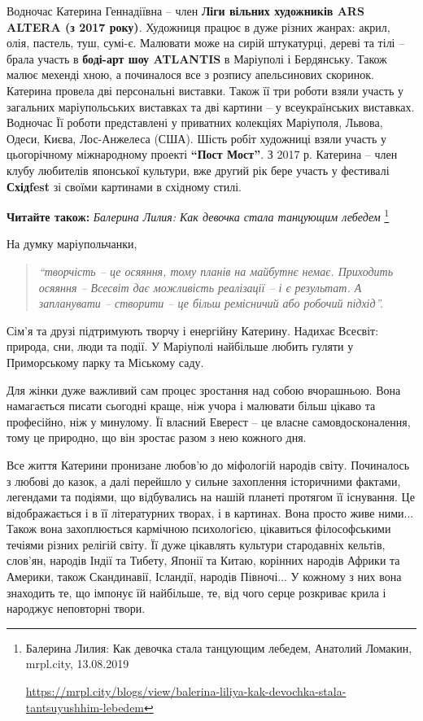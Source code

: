 Водночас Катерина Геннадіївна – член \textbf{Ліги вільних художників ARS ALTERA (з 2017
року)}. Художниця працює в дуже різних жанрах: акрил, олія, пастель, туш,
сумі-є. Малювати може на сирій штукатурці, дереві та тілі – брала участь в
\textbf{боді-арт шоу ATLANTIS} в Маріуполі і Бердянську. Також малює мехенді хною, а
починалося все з розпису апельсинових скоринок. Катерина провела дві
персональні виставки. Також її три роботи взяли участь у загальних
маріупольських виставках та дві картини – у всеукраїнських виставках. Водночас
Її роботи представлені у приватних колекціях Маріуполя, Львова, Одеси, Києва,
Лос-Анжелеса (США). Шість робіт художниці взяли участь у цьогорічному
міжнародному проекті \textbf{\enquote{Пост Мост}}. З 2017 р. Катерина – член клубу любителів
японської культури, вже другий рік бере участь у фестивалі \textbf{Східfest} зі своїми
картинами в східному стилі.

\textbf{Читайте також:} \emph{Балерина Лилия: Как девочка стала танцующим лебедем}%
\footnote{Балерина Лилия: Как девочка стала танцующим лебедем, Анатолий Ломакин, mrpl.city, 13.08.2019 \par%
\url{https://mrpl.city/blogs/view/balerina-liliya-kak-devochka-stala-tantsuyushhim-lebedem}}


На думку маріупольчанки, 

\begin{quote}
\em\enquote{творчість – це осяяння, тому планів на майбутнє
немає. Приходить осяяння – Всесвіт дає можливість реалізації – і є результат. А
запланувати – створити – це більш ремісничий або робочий підхід}.
\end{quote}

Сім'я та друзі підтримують творчу і енергійну Катерину. Надихає Всесвіт:
природа, сни, люди та події. У Маріуполі найбільше любить гуляти у Приморському
парку та Міському саду.

Для жінки дуже важливий сам процес зростання над собою вчорашньою. Вона
намагається писати сьогодні краще, ніж учора і малювати більш цікаво та
професійно, ніж у минулому. Її власний Еверест – це власне самовдосконалення,
тому це природно, що він зростає разом з нею кожного дня.


Все життя Катерини пронизане любов'ю до міфологій народів світу. Починалось з
любові до казок, а далі перейшло у сильне захоплення історичними фактами,
легендами та подіями, що відбувались на нашій планеті протягом її існування. Це
відображається і в її літературних творах, і в картинах. Вона просто живе
ними... Також вона захоплюється кармічною психологією, цікавиться філософськими
течіями різних релігій світу. Її дуже цікавлять культури стародавніх кельтів,
слов'ян, народів Індії та Тибету, Японії та Китаю, корінних народів Африки та
Америки, також Скандинавії, Ісландії, народів Півночі... У кожному з них вона
знаходить те, що імпонує їй найбільше, те, від чого серце розкриває крила і
народжує неповторні твори.

